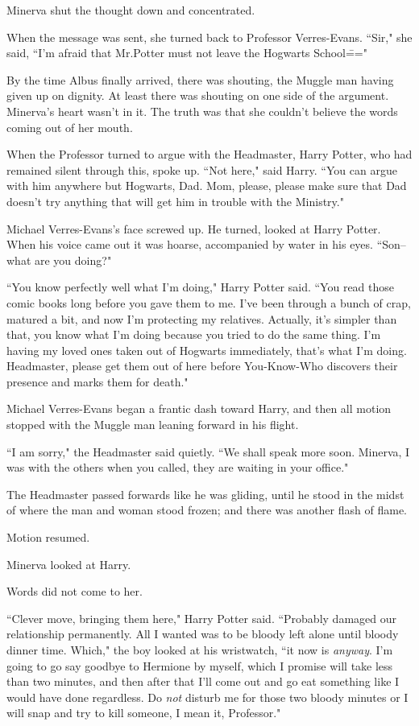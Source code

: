 Minerva shut the thought down and concentrated.

When the message was sent, she turned back to Professor Verres-Evans. ``Sir," she said, ``I'm afraid that Mr.\?Potter must not leave the Hogwarts School\==="

By the time Albus finally arrived, there was shouting, the Muggle man having given up on dignity. At least there was shouting on one side of the argument. Minerva's heart wasn't in it. The truth was that she couldn't believe the words coming out of her mouth.

When the Professor turned to argue with the Headmaster, Harry Potter, who had remained silent through this, spoke up. ``Not here," said Harry. ``You can argue with him anywhere but Hogwarts, Dad. Mom, please, please make sure that Dad doesn't try anything that will get him in trouble with the Ministry."

Michael Verres-Evans's face screwed up. He turned, looked at Harry Potter. When his voice came out it was hoarse, accompanied by water in his eyes. ``Son\---what are you doing?"

``You know perfectly well what I'm doing," Harry Potter said. ``You read those comic books long before you gave them to me. I've been through a bunch of crap, matured a bit, and now I'm protecting my relatives. Actually, it's simpler than that, you know what I'm doing because you tried to do the same thing. I'm having my loved ones taken out of Hogwarts immediately, that's what I'm doing. Headmaster, please get them out of here before You-Know-Who discovers their presence and marks them for death."

Michael Verres-Evans began a frantic dash toward Harry, and then all motion stopped with the Muggle man leaning forward in his flight.

``I am sorry," the Headmaster said quietly. ``We shall speak more soon. Minerva, I was with the others when you called, they are waiting in your office."

The Headmaster passed forwards like he was gliding, until he stood in the midst of where the man and woman stood frozen; and there was another flash of flame.

Motion resumed.

Minerva looked at Harry.

Words did not come to her.

``Clever move, bringing them here," Harry Potter said. ``Probably damaged our relationship permanently. All I wanted was to be bloody left alone until bloody dinner time. Which," the boy looked at his wristwatch, ``it now is \emph{anyway}. I'm going to go say goodbye to Hermione by myself, which I promise will take less than two minutes, and then after that I'll come out and go eat something like I would have done regardless. Do \emph{not} disturb me for those two bloody minutes or I will snap and try to kill someone, I mean it, Professor."

